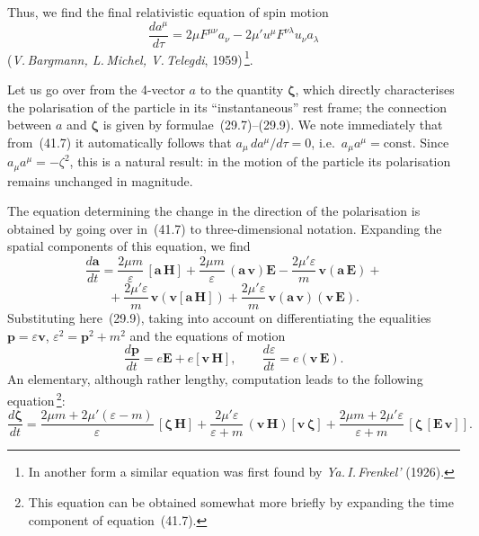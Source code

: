 Thus, we find the final relativistic equation of spin motion
\begin{equation}
\frac{da^\mu}{d\tau} = 2\mu F^{\mu\nu}a_\nu - 2\mu' u^\mu F^{\nu\lambda}u_\nu a_\lambda
\tag{41.7}
\end{equation}
(\textit{V.\,Bargmann, L.\,Michel, V.\,Telegdi}, 1959)\,\footnote{In another form a similar equation was first found by \textit{Ya.\,I.\,Frenkel'} (1926).}.

Let us go over from the 4-vector $a$ to the quantity $\boldsymbol{\zeta}$, which directly characterises the polarisation of the particle in its ``instantaneous'' rest frame; the connection between $a$ and $\boldsymbol{\zeta}$ is given by formulae~(29.7)--(29.9). We note immediately that from~(41.7) it automatically follows that $a_\mu\,da^\mu/d\tau = 0$, i.e.\ $a_\mu a^\mu = \mathrm{const}$. Since $a_\mu a^\mu = -\zeta^2$, this is a natural result: in the motion of the particle its polarisation remains unchanged in magnitude.

The equation determining the change in the direction of the polarisation is obtained by going over in~(41.7) to three-dimensional notation. Expanding the spatial components of this equation, we find
\[
\frac{d\mathbf{a}}{dt} = \frac{2\mu m}{\varepsilon}\,[\mathbf{a}\,\mathbf{H}] + \frac{2\mu m}{\varepsilon}\,(\mathbf{a}\,\mathbf{v})\mathbf{E} - \frac{2\mu'\varepsilon}{m}\,\mathbf{v}(\mathbf{a}\,\mathbf{E}) +
\]
\[
{} + \frac{2\mu'\varepsilon}{m}\,\mathbf{v}(\mathbf{v}[\mathbf{a}\,\mathbf{H}]) + \frac{2\mu'\varepsilon}{m}\,\mathbf{v}(\mathbf{a}\,\mathbf{v})(\mathbf{v}\,\mathbf{E}).
\]
Substituting here~(29.9), taking into account on differentiating the equalities $\mathbf{p} = \varepsilon\mathbf{v}$, $\varepsilon^2 = \mathbf{p}^2 + m^2$ and the equations of motion
\begin{equation}
\frac{d\mathbf{p}}{dt} = e\mathbf{E} + e[\mathbf{v}\,\mathbf{H}],\qquad \frac{d\varepsilon}{dt} = e(\mathbf{v}\,\mathbf{E}).
\tag{41.8}
\end{equation}
An elementary, although rather lengthy, computation leads to the following equation\,\footnote{This equation can be obtained somewhat more briefly by expanding the time component of equation~(41.7).}:
\begin{equation}
\frac{d\boldsymbol{\zeta}}{dt} = \frac{2\mu m + 2\mu'(\varepsilon - m)}{\varepsilon}\,[\boldsymbol{\zeta}\,\mathbf{H}] + \frac{2\mu'\varepsilon}{\varepsilon + m}\,(\mathbf{v}\,\mathbf{H})[\mathbf{v}\,\boldsymbol{\zeta}] + \frac{2\mu m + 2\mu'\varepsilon}{\varepsilon + m}\,[\boldsymbol{\zeta}\,[\mathbf{E}\,\mathbf{v}]].
\tag{41.9}
\end{equation}

